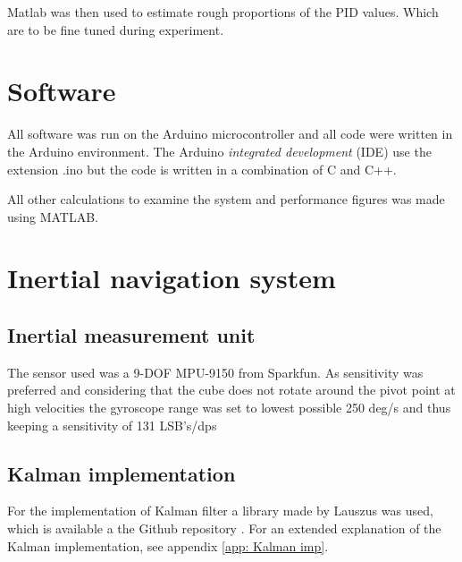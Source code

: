 \documentclass[a4paper,11pt]{kth-mag}
\begin{document}
Matlab was then used to estimate rough proportions of the PID values. Which are to be fine tuned during experiment.


\section{Software}
All software was run on the Arduino microcontroller and all code were written in the Arduino environment. The Arduino \textit{integrated development} (IDE) use the extension .ino but the code is written in a combination of C and C++.

All other calculations to examine the system and performance figures was made using MATLAB.

\section{Inertial navigation system}

\subsection{Inertial measurement unit}
The sensor used was a 9-DOF MPU-9150 from Sparkfun. As sensitivity was preferred and considering that the cube does not rotate around the pivot point at high velocities the gyroscope range was set to lowest possible 250 deg/s and thus keeping a sensitivity of 131 LSB's/dps


\subsection{Kalman implementation}
For the implementation of Kalman filter a library made by Lauszus was used, which is available a the Github repository \cite{TKJkalman}. For an extended explanation of the Kalman implementation, see appendix \ref{app: Kalman imp}.
\end{document}
